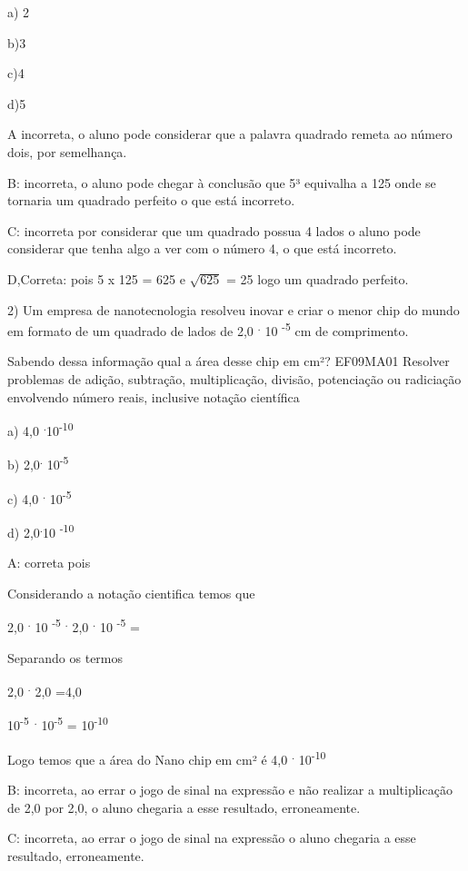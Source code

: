 a) 2

b)3

c)4

d)5

A incorreta, o aluno pode considerar que a palavra quadrado remeta ao
número dois, por semelhança.

B: incorreta, o aluno pode chegar à conclusão que 5³ equivalha a 125
onde se tornaria um quadrado perfeito o que está incorreto.

C: incorreta por considerar que um quadrado possua 4 lados o aluno pode
considerar que tenha algo a ver com o número 4, o que está incorreto.

D,Correta: pois 5 x 125 = 625 e \(\sqrt{625}\) = 25 logo um quadrado
perfeito.

2) Um empresa de nanotecnologia resolveu inovar e criar o menor chip do
mundo em formato de um quadrado de lados de 2,0 \textsuperscript{.} 10
\textsuperscript{-5} cm de comprimento.

Sabendo dessa informação qual a área desse chip em cm²? EF09MA01
Resolver problemas de adição, subtração, multiplicação, divisão,
potenciação ou radiciação envolvendo número reais, inclusive notação
científica

a) 4,0 \textsuperscript{.}10\textsuperscript{-10}

b) 2,0\textsuperscript{.} 10\textsuperscript{-5}

c) 4,0 \textsuperscript{.} 10\textsuperscript{-5}

d) 2,0\textsuperscript{.}10 \textsuperscript{-10}

A: correta pois

Considerando a notação cientifica temos que

2,0 \textsuperscript{.} 10 \textsuperscript{-5} \textsuperscript{.} 2,0
\textsuperscript{.} 10 \textsuperscript{-5} =

Separando os termos

2,0 \textsuperscript{.} 2,0 =4,0

10\textsuperscript{-5~.} 10\textsuperscript{-5} =
10\textsuperscript{-10}

Logo temos que a área do Nano chip em cm² é 4,0 \textsuperscript{.}
10\textsuperscript{-10}

B: incorreta, ao errar o jogo de sinal na expressão e não realizar a
multiplicação de 2,0 por 2,0, o aluno chegaria a esse resultado,
erroneamente.

C: incorreta, ao errar o jogo de sinal na expressão o aluno chegaria a
esse resultado, erroneamente.

